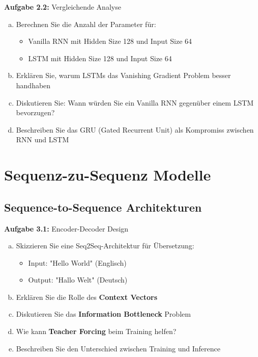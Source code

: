 \documentclass[12pt,a4paper]{article}
\begin{document}
\textbf{Aufgabe 2.2:} Vergleichende Analyse

\begin{enumerate}[(a)]
    \item Berechnen Sie die Anzahl der Parameter für:
    \begin{itemize}
        \item Vanilla RNN mit Hidden Size 128 und Input Size 64
        \item LSTM mit Hidden Size 128 und Input Size 64
    \end{itemize}
    \item Erklären Sie, warum LSTMs das Vanishing Gradient Problem besser handhaben
    \item Diskutieren Sie: Wann würden Sie ein Vanilla RNN gegenüber einem LSTM bevorzugen?
    \item Beschreiben Sie das GRU (Gated Recurrent Unit) als Kompromiss zwischen RNN und LSTM
\end{enumerate}

\section{Sequenz-zu-Sequenz Modelle}

\subsection{Sequence-to-Sequence Architekturen}

\textbf{Aufgabe 3.1:} Encoder-Decoder Design

\begin{enumerate}[(a)]
    \item Skizzieren Sie eine Seq2Seq-Architektur für Übersetzung:
    \begin{itemize}
        \item Input: "Hello World" (Englisch)
        \item Output: "Hallo Welt" (Deutsch)
    \end{itemize}
    \item Erklären Sie die Rolle des \textbf{Context Vectors}
    \item Diskutieren Sie das \textbf{Information Bottleneck} Problem
    \item Wie kann \textbf{Teacher Forcing} beim Training helfen?
    \item Beschreiben Sie den Unterschied zwischen Training und Inference
\end{enumerate}
\end{document}
